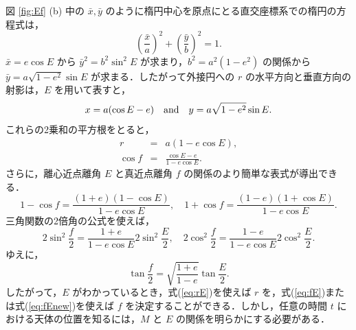 \documentclass[11pt,a4paper,oneside,onecolumn]{jreport}
\begin{document}
図 \ref{fig:Ef} (b) 中の $\bar{x}, \bar{y}$ のように楕円中心を原点にとる直交座標系での楕円の方程式は，
\begin{equation}
\left( \frac{\bar{x}}{a} \right)^2 + \left( \frac{\bar{y}}{b} \right)^2 = 1.
\end{equation}
$\bar{x} = e \cos E$ から $\bar{y}^2 = b^2 \sin^2 E$ が求まり，$b^2 = a^2 (1 - e^2)$ の関係から $\bar{y} = a \sqrt{1 - e^2} \sin E$ が求まる．したがって外接円への $r$ の水平方向と垂直方向の射影は，$E$ を用いて表すと，
\begin{equation}
x = a (\cos E - e) \quad {\rm and} \quad y = a \sqrt{1 - e^2} \sin E. \label{eq:xEyE}
\end{equation}
これらの2乗和の平方根をとると，
\begin{eqnarray}
r & = & a (1 - e \cos E), \label{eq:rE} \\
\cos f & = & \frac{\cos E - e}{1 - e \cos E}. \label{eq:fE}
\end{eqnarray}
さらに，離心近点離角 $E$ と真近点離角 $f$ の関係のより簡単な表式が導出できる．
\begin{equation}
1 - \cos f = \frac{(1 + e) (1 - \cos E)}{1 - e \cos E}, \quad 1 + \cos f = \frac{(1 - e) (1 + \cos E)}{1 - e \cos E}.
\end{equation}
三角関数の2倍角の公式を使えば，
\begin{equation}
2 \sin^2 \frac{f}{2} = \frac{1 + e}{1 - e \cos E} 2 \sin^2 \frac{E}{2}, \quad 2 \cos^2 \frac{f}{2} = \frac{1 - e}{1 - e \cos E} 2 \cos^2 \frac{E}{2}.
\end{equation}
ゆえに，
\begin{equation}
\tan \frac{f}{2} = \sqrt{\frac{1 + e}{1 - e}} \tan \frac{E}{2}. \label{eq:fEnew}
\end{equation}
したがって，$E$ がわかっているとき，式(\ref{eq:rE})を使えば $r$ を，式(\ref{eq:fE})または式(\ref{eq:fEnew})を使えば $f$ を決定することができる．しかし，任意の時間 $t$ における天体の位置を知るには，$M$ と $E$ の関係を明らかにする必要がある．
\end{document}
